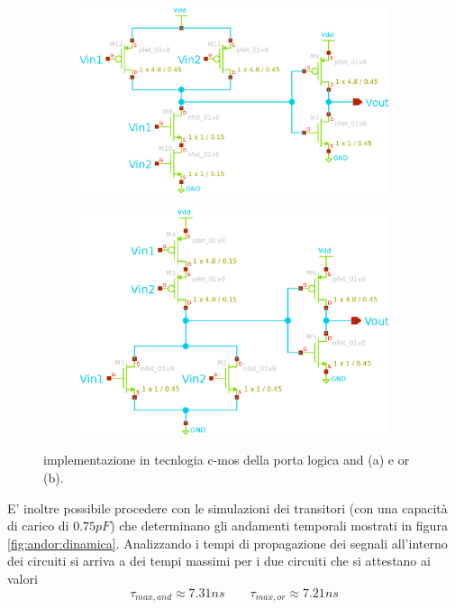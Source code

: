 	\begin{figure}[bht]
	\centering
	\begin{subfigure}{0.48\linewidth}
		\centering \includegraphics[width=0.9\linewidth]{Immagini/and-gate} \caption{}
	\end{subfigure}
	\begin{subfigure}{0.48\linewidth}
		\centering \includegraphics[width=0.9\linewidth]{Immagini/or-gate} \caption{}
	\end{subfigure}
	\caption{implementazione in tecnlogia c-mos della porta logica and (a) e or (b).}
	\label{fig:andor:schematico}
	\end{figure}

	E' inoltre possibile procedere con le simulazioni dei transitori (con una capacità di carico di $0.75pF$) che determinano gli andamenti temporali mostrati in figura \ref{fig:andor:dinamica}. Analizzando i tempi di propagazione dei segnali all'interno dei circuiti si arriva a dei tempi massimi per i due circuiti che si attestano ai valori
	\[ \tau_{max,and} \approx 7.31 ns \qquad \tau_{max,or} \approx 7.21 ns  \]


